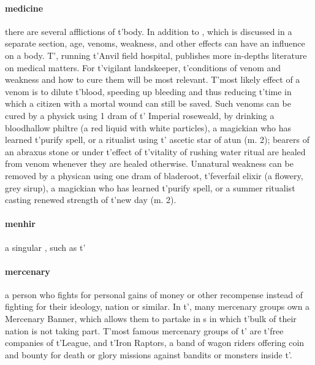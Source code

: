 \paragraph{medicine} there are several afflictions of t'\allowbreak body. In addition to , which is discussed in a separate section, age, venoms, weakness, and other effects can have an influence on a body. T', running t'\allowbreak Anvil field hospital, publishes more in-depths literature on medical matters. For t'\allowbreak vigilant landskeeper, t'\allowbreak conditions of venom and weakness and how to cure them will be most relevant. T'most likely effect of a venom is to dilute t'\allowbreak blood, speeding up bleeding and thus reducing t'\allowbreak time in which a citizen with a mortal wound can still be saved. Such venoms can be cured by a physick using 1 dram of t'\allowbreak {} Imperial roseweald, by drinking a bloodhallow philtre  (a red liquid with white particles), a magickian who has learned t'\allowbreak purify spell, or a  ritualist using t'\allowbreak {} ascetic star of atun (m. 2); bearers of an abraxus stone or under t'\allowbreak effect of t'\allowbreak vitality of rushing water ritual are healed from venom whenever they are healed otherwise. Unnatural weakness can be removed by a physican using one dram of bladeroot, t'\allowbreak feverfail elixir (a flowery, grey sirup), a magickian who has learned t'\allowbreak purify spell, or a summer ritualist casting renewed strength of t'\allowbreak new day (m. 2). 
\paragraph{menhir} a singular , such as t'\allowbreak {}
\paragraph{mercenary} a person who fights for personal gains of money or other recompense instead of fighting for their ideology, nation or similar. In t'\allowbreak {}, many mercenary groups own a Mercenary Banner, which allows them to partake in s in which t'\allowbreak bulk of their nation is not taking part. T'most famous mercenary groups of t'\allowbreak {} are t'\allowbreak free companies of t'\allowbreak League, and t'\allowbreak Iron Raptors, a band of wagon riders offering coin and bounty for death or glory missions against bandits or monsters inside t'\allowbreak {}.
